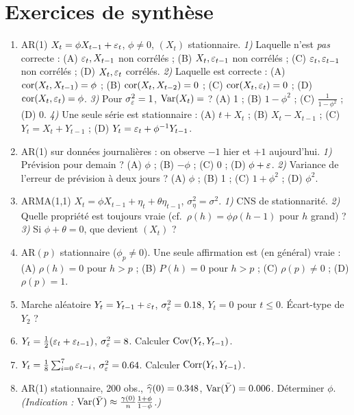 \documentclass[11pt]{article}
\begin{document}
\section{Exercices de synthèse}
\begin{enumerate}[label=\textbf{Q\,J.\arabic*},leftmargin=*]
\item AR(1) $X_t=\phi X_{t-1}+\varepsilon_t$, $\phi\ne0$, $(X_t)$ stationnaire.
\emph{1)} Laquelle n'est \emph{pas} correcte : (A) $\varepsilon_t,X_{t-1}$ non corrélés ;
(B) $X_t,\varepsilon_{t-1}$ non corrélés ; (C) $\varepsilon_t,\varepsilon_{t-1}$ non corrélés ;
(D) $X_t,\varepsilon_t$ corrélés.
\emph{2)} Laquelle est correcte : (A) $\operatorname{cor}(X_t,X_{t-1})=\phi$ ; (B) $\operatorname{cor}(X_t,X_{t-2})=0$ ;
(C) $\operatorname{cor}(X_t,\varepsilon_t)=0$ ; (D) $\operatorname{cor}(X_t,\varepsilon_t)=\phi$.
\emph{3)} Pour $\sigma_\varepsilon^2=1$, $\operatorname{Var}(X_t)=$ ? (A) 1 ; (B) $1-\phi^2$ ;
(C) $\frac1{1-\phi^2}$ ; (D) 0.
\emph{4)} Une seule série est stationnaire : (A) $t+X_t$ ; (B) $X_t-X_{t-1}$ ;
(C) $Y_t=X_t+Y_{t-1}$ ; (D) $Y_t=\varepsilon_t+\phi^{-1}Y_{t-1}$.

\item AR(1) sur données journalières : on observe $-1$ hier et $+1$ aujourd'hui.
\emph{1)} Prévision pour demain ? (A) $\phi$ ; (B) $-\phi$ ; (C) 0 ; (D) $\phi+\varepsilon$.
\emph{2)} Variance de l'erreur de prévision à deux jours ? (A) $\phi$ ; (B) 1 ;
(C) $1+\phi^2$ ; (D) $\phi^2$.

\item ARMA(1,1) $X_t=\phi X_{t-1}+\eta_t+\theta\eta_{t-1}$, $\sigma_\eta^2=\sigma^2$.
\emph{1)} CNS de stationnarité. \emph{2)} Quelle propriété est toujours vraie
(cf.\ $\rho(h)=\phi\rho(h-1)$ pour $h$ grand) ? \emph{3)} Si $\phi+\theta=0$, que devient
$(X_t)$ ?

\item AR$(p)$ stationnaire ($\phi_p\ne0$). Une seule affirmation est (en général) vraie :
(A) $\rho(h)=0$ pour $h>p$ ; (B) $P(h)=0$ pour $h>p$ ; (C) $\rho(p)\ne0$ ; (D) $\rho(p)=1$.

\item Marche aléatoire $Y_t=Y_{t-1}+\varepsilon_t$, $\sigma_\varepsilon^2=0.18$, $Y_t=0$ pour $t\le0$.
Écart-type de $Y_2$ ?

\item $Y_t=\tfrac12(\varepsilon_t+\varepsilon_{t-1})$, $\sigma_\varepsilon^2=8$. Calculer $\operatorname{Cov}(Y_t,Y_{t-1})$.

\item $Y_t=\tfrac18\sum_{i=0}^{7}\varepsilon_{t-i}$, $\sigma_\varepsilon^2=0.64$. Calculer
$\operatorname{Corr}(Y_t,Y_{t-1})$.

\item AR(1) stationnaire, 200 obs., $\widehat{\gamma}(0)=0.348$, $\operatorname{Var}(\bar Y)=0.006$. Déterminer
$\phi$. \emph{(Indication : $\operatorname{Var}(\bar Y)\approx\frac{\gamma(0)}{n}\frac{1+\phi}{1-\phi}$.)}


\end{enumerate}
\end{document}
